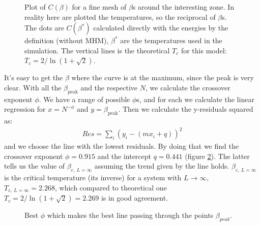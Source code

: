 \documentclass[../main.tex]{subfiles}
\begin{document}
\begin{figure}[ht!]
    \centerline{}
    \caption{Plot of $C(\beta)$ for a fine mesh of $\beta$s around the interesting zone. In reality here are plotted the temperatures, so the reciprocal of $\beta$s. The dots are $C(\beta^*)$ calculated directly with the energies by the definition (without MHM), $\beta^*$ are the temperatures used in the simulation. The vertical lines is the theoretical $T_c$ for this model: $T_c=2/\ln({1+\sqrt{2}})$.}
    \label{fig: ex_12_all_peaks}
\end{figure}

It's easy to get the $\beta$ where the curve is at the maximum, since the peak is very clear. With all the $\beta_{\text{peak}}$ and the respective $N$, we calculate the crossover exponent $\phi$. We have a range of possible $\phi$s, and for each we calculate the linear regression for $x=N^{-\phi}$ and $y=\beta_{\text{peak}}$. Then we calculate the y-residuals squared as:
\begin{align}
    Res = \sum_i (y_i - (mx_i + q))^2
\end{align} and we choose the line with the lowest residuals. By doing that we find the crossover exponent $\phi = 0.915$ and the intercept $q=0.441$ (figure \ref{fig: ex_12_line}). The latter tells us the value of $\beta_{c,\ L=\infty}$ assuming the trend given by the line holds. $\beta_{c,\ L=\infty}$ is the critical temperature (its inverse) for a system with $L \rightarrow \infty$, $T_{c,\ L=\infty} =2.268$, which compared to theoretical one $T_c=2/\ln({1+\sqrt{2}})=2.269$ is in good agreement.

\begin{figure}[ht!]
    \centerline{}
    \caption{Best $\phi$ which makes the best line passing through the points $\beta_{peak}$.}
    \label{fig: ex_12_line}
\end{figure}
\end{document}
